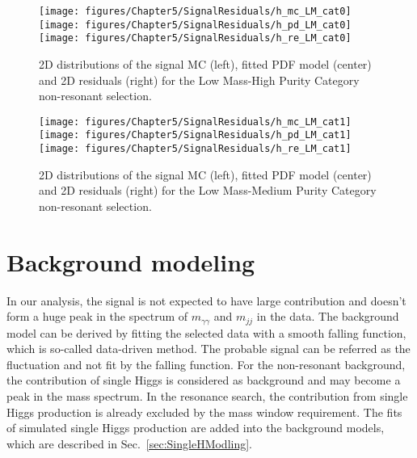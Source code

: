 \begin{figure*}[h]
  \centering
\texttt{[image: figures/Chapter5/SignalResiduals/h\_mc\_LM\_cat0]}\hfil
\texttt{[image: figures/Chapter5/SignalResiduals/h\_pd\_LM\_cat0]}\hfil
\texttt{[image: figures/Chapter5/SignalResiduals/h\_re\_LM\_cat0]}\hfil
  \caption{2D distributions of the signal MC (left), fitted PDF model (center) and 2D residuals (right) for the Low Mass-High Purity Category non-resonant selection.}
  \label{fig:sig_resi_3}
\end{figure*}


\begin{figure*}[h]
  \centering
\texttt{[image: figures/Chapter5/SignalResiduals/h\_mc\_LM\_cat1]}\hfil
\texttt{[image: figures/Chapter5/SignalResiduals/h\_pd\_LM\_cat1]}\hfil
\texttt{[image: figures/Chapter5/SignalResiduals/h\_re\_LM\_cat1]}\hfil
  \caption{2D distributions of the signal MC (left), fitted PDF model (center) and 2D residuals (right) for the Low Mass-Medium Purity Category non-resonant selection.}
  \label{fig:sig_resi_4}
\end{figure*}


\section{Background modeling} \label{sec:BgkModling}


In our analysis, the signal is not expected to have large contribution and doesn't form a huge peak in the spectrum of $m_{\gamma\gamma}$ and $m_{jj}$ in the data.
The background model can be derived by fitting the selected data with a smooth falling function, which is so-called data-driven method.
The probable signal can be referred as the fluctuation and not fit by the falling function.
For the non-resonant background, the contribution of single Higgs is considered as background and may become a peak in the mass spectrum.
In the resonance search, the contribution from single Higgs production is already excluded by the mass window requirement.
The fits of simulated single Higgs production are added into the background models, which are described in Sec.~\ref{sec:SingleHModling}.

